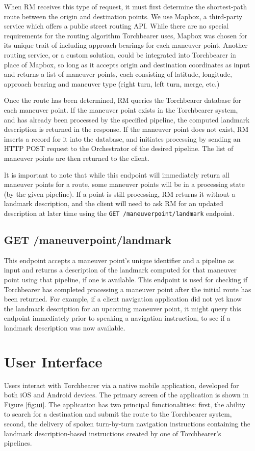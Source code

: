 When RM receives this type of request, it must first determine the shortest-path route between the origin and destination points. We use Mapbox, a third-party service which offers a public street routing API. While there are no special requirements for the routing algorithm Torchbearer uses, Mapbox was chosen for its unique trait of including approach bearings for each maneuver point. Another routing service, or a custom solution, could be integrated into Torchbearer in place of Mapbox, so long as it accepts origin and destination coordinates as input and returns a list of maneuver points, each consisting of latitude, longitude, approach bearing and maneuver type (right turn, left turn, merge, etc.)

Once the route has been determined, RM queries the Torchbearer database for each maneuver point. If the maneuver point exists in the Torchbearer system, and has already been processed by the specified pipeline, the computed landmark description is returned in the response. If the maneuver point does not exist, RM inserts a record for it into the database, and initiates processing by sending an HTTP POST request to the Orchestrator of the desired pipeline. The list of maneuver points are then returned to the client.

It is important to note that while this endpoint will immediately return all maneuver points for a route, some maneuver points will be in a processing state (by the given pipeline). If a point is still processing, RM returns it without a landmark description, and the client will need to ask RM for an updated description at later time using the \texttt{GET /maneuverpoint/landmark} endpoint.

\subsection{GET /maneuverpoint/landmark}
This endpoint accepts a maneuver point’s unique identifier and a pipeline as input and returns a description of the landmark computed for that maneuver point using that pipeline, if one is available. This endpoint is used for checking if Torchbearer has completed processing a maneuver point after the initial route has been returned. For example, if a client navigation application did not yet know the landmark description for an upcoming maneuver point, it might query this endpoint immediately prior to speaking a navigation instruction, to see if a landmark description was now available.

\section{User Interface}\label{sec:arch:ui}
Users interact with Torchbearer via a native mobile application, developed for both iOS and Android devices. The primary screen of the application is shown in Figure \ref{fig:ui}. The application has two principal functionalities: first, the ability to search for a destination and submit the route to the Torchbearer system, second, the delivery of spoken turn-by-turn navigation instructions containing the landmark description-based instructions created by one of Torchbearer’s pipelines.

